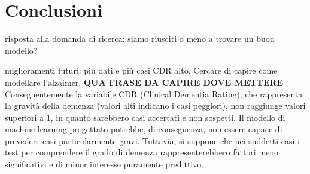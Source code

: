 \section{Conclusioni}
risposta alla domanda di ricerca: siamo riusciti o meno a trovare un buon modello?

miglioramenti futuri: più dati e più casi CDR alto. Cercare di capire come modellare l'alzaimer.
\textbf{QUA FRASE DA CAPIRE DOVE METTERE}
Conseguentemente la variabile CDR (Clinical Dementia Rating), che rappresenta la gravità della demenza (valori alti indicano i casi peggiori), non raggiunge valori superiori a 1, in quanto sarebbero casi accertati e non sospetti. Il modello di machine learning progettato potrebbe, di conseguenza, non essere capace di prevedere casi particolarmente gravi. Tuttavia, si suppone che nei suddetti casi i test per comprendere il grado di demenza rappresenterebbero fattori meno significativi e di minor interesse puramente predittivo.

